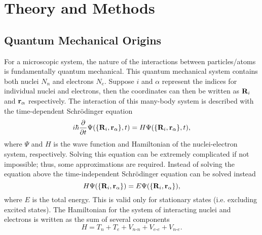 \chapter{Theory and Methods}
\label{chap:methods}


\section{Quantum Mechanical Origins}
For a microscopic system, the nature of the interactions between particles/atoms is 
fundamentally quantum mechanical. This quantum mechanical system contains both nuclei $N_{n}$ 
and electrons $N_{e}$. Suppose $i$ and $\alpha$ represent the indices for individual nuclei 
and electrons, then the coordinates can then be written as ${\bf R}_{i}$ and ${\bf r}_{\alpha}$ 
respectively. The interaction of this many-body system is described with the time-dependent 
Schr\"{o}dinger equation
\begin{equation}
i\hbar\frac{\partial}{\partial t}\Psi(\{{\bf R}_{i},{\bf r}_{\alpha}\},t) = H\Psi(\{{\bf R}_{i},{\bf r}_{\alpha}\},t),
\end{equation}
where $\Psi$ and $H$ is the wave function and Hamiltonian of the nuclei-electron system, 
respectively. Solving this equation can be extremely complicated if not impossible; thus, 
some approximations are required. Instead of solving the equation above the time-independent 
Schr\"{o}dinger equation can be solved instead
\begin{equation}
H\Psi(\{{\bf R}_{i},{\bf r}_{\alpha}\}) = E\Psi(\{{\bf R}_{i},{\bf r}_{\alpha}\}),
\end{equation}
where $E$ is the total energy. This is valid only for stationary states (i.e. excluding 
excited states). The Hamiltonian for the system of interacting nuclei and electrons is 
written as the sum of several components
\begin{equation}
H = T_{n} + T_{e} + V_{n\text{-}n} + V_{e\text{-}e} + V_{n\text{-}e}.
\end{equation}

